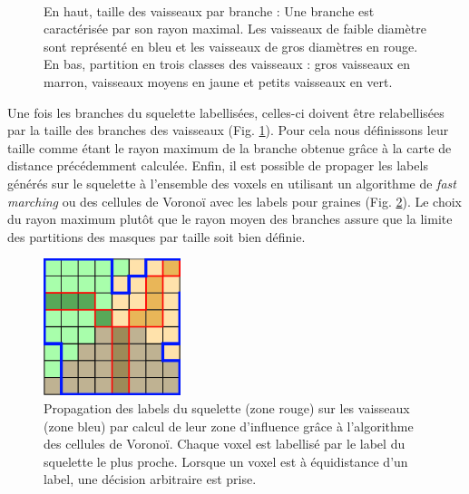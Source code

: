 \begin{figure}[!ht]
  \centering
  \\
  \caption{En haut, taille des vaisseaux par branche : Une branche est caractérisée par son rayon maximal. Les vaisseaux de faible diamètre sont représenté en bleu et les vaisseaux de gros diamètres en rouge. En bas, partition en trois classes des vaisseaux : gros vaisseaux en marron, vaisseaux moyens en jaune et petits vaisseaux en vert.}
  \label{fig:vessels_partition}
\end{figure}

Une fois les branches du squelette labellisées, celles-ci doivent être relabellisées par la taille des branches des vaisseaux (Fig. \ref{fig:vessels_partition}). Pour cela nous définissons leur taille comme étant le rayon maximum de la branche obtenue grâce à la carte de distance précédemment calculée. Enfin, il est possible de propager les labels générés sur le squelette à l'ensemble des voxels en utilisant un algorithme de \textit{fast marching} ou des cellules de Voronoï avec les labels pour graines (Fig. \ref{fig:voronoi}). Le choix du rayon maximum plutôt que le rayon moyen des branches assure que la limite des partitions des masques par taille soit bien définie.

\begin{figure}[!ht]
  \centering
  \includegraphics[height=4cm]{Images/voronoi.png}
  \caption{Propagation des labels du squelette (zone rouge) sur les vaisseaux (zone bleu) par calcul de leur zone d'influence grâce à l'algorithme des cellules de Voronoï. Chaque voxel est labellisé par le label du squelette le plus proche. Lorsque un voxel est à équidistance d'un label, une décision arbitraire est prise.}
  \label{fig:voronoi}
\end{figure}

